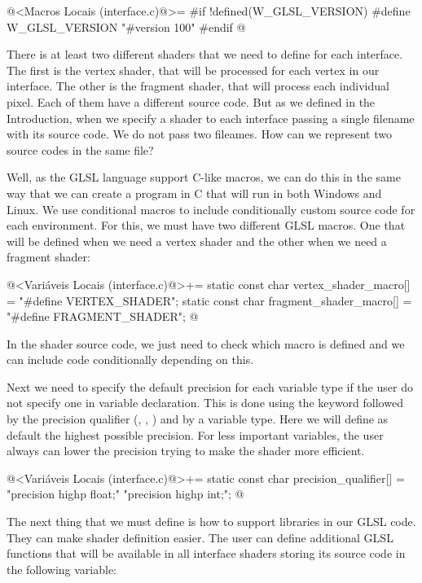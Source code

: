 \iniciocodigo
@<Macros Locais (interface.c)@>=
#if !defined(W_GLSL_VERSION)
#define W_GLSL_VERSION "#version 100\n"
#endif
@
\fimcodigo

There is at least two different shaders that we need to define for
each interface. The first is the vertex shader, that will be processed
for each vertex in our interface. The other is the fragment shader,
that will process each individual pixel. Each of them have a different
source code. But as we defined in the Introduction, when we specify a
shader to each interface passing a single filename with its source
code. We do not pass two fileames. How can we represent two source
codes in the same file?

Well, as the GLSL language support C-like macros, we can do this in
the same way that we can create a program in C that will run in both
Windows and Linux. We use conditional macros to include conditionally
custom source code for each environment. For this, we must have two
different GLSL macros. One that will be defined when we need a vertex
shader and the other when we need a fragment shader:

\iniciocodigo
@<Variáveis Locais (interface.c)@>+=
static const char vertex_shader_macro[] = "#define VERTEX_SHADER\n";
static const char fragment_shader_macro[] = "#define FRAGMENT_SHADER\n";
@
\fimcodigo

In the shader source code, we just need to check which macro is
defined and we can include code conditionally depending on this.

Next we need to specify the default precision for each variable type
if the user do not specify one in variable declaration. This is done
using the keyword  followed by the precision
qualifier (, ,
) and by a variable type. Here we will define as
default the highest possible precision. For less important variables,
the user always can lower the precision trying to make the shader more
efficient.

\iniciocodigo
@<Variáveis Locais (interface.c)@>+=
static const char precision_qualifier[] = "precision highp float;\n"
                                          "precision highp int;\n";
@
\fimcodigo

The next thing that we must define is how to support libraries in our
GLSL code. They can make shader definition easier. The user can
define additional GLSL functions that will be available in all
interface shaders storing its source code in the following variable:

